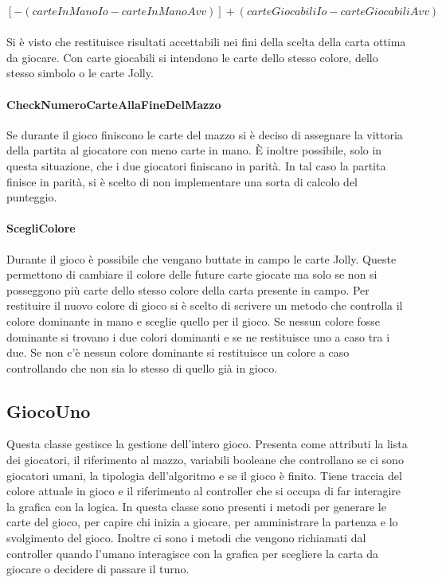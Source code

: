 $ [- (carteInManoIo - carteInManoAvv)] + (carteGiocabiliIo - carteGiocabiliAvv) $\\\\
		
		Si è visto che restituisce risultati accettabili nei fini della scelta della carta ottima da giocare. Con carte giocabili si intendono le carte dello stesso colore, dello stesso simbolo o le carte Jolly. 
		
		\paragraph{CheckNumeroCarteAllaFineDelMazzo}
		Se durante il gioco finiscono le carte del mazzo si è deciso di assegnare la vittoria della partita al giocatore con meno carte in mano. È inoltre possibile, solo in questa situazione, che i due giocatori finiscano in parità. In tal caso la partita finisce in parità, si è scelto di non implementare una sorta di calcolo del punteggio.
		
		\paragraph{ScegliColore}
		Durante il gioco è possibile che vengano buttate in campo le carte Jolly. Queste permettono di cambiare il colore delle future carte giocate ma solo se non si posseggono più carte dello stesso colore della carta presente in campo. Per restituire il nuovo colore di gioco si è scelto di scrivere un metodo che controlla il colore dominante in mano e sceglie quello per il gioco. Se nessun colore fosse dominante si trovano i due colori dominanti e se ne restituisce uno a caso tra i due. Se non c'è nessun colore dominante si restituisce un colore a caso controllando che non sia lo stesso di quello già in gioco.
	
	\subsection{GiocoUno}
		Questa classe gestisce la gestione dell'intero gioco. Presenta come attributi la lista dei giocatori, il riferimento al mazzo, variabili booleane che controllano se ci sono giocatori umani, la tipologia dell'algoritmo e se il gioco è finito. Tiene traccia del colore attuale in gioco e il riferimento al controller che si occupa di far interagire la grafica con la logica. In questa classe sono presenti i metodi per generare le carte del gioco, per capire chi inizia a giocare, per amministrare la partenza e lo svolgimento del gioco. Inoltre ci sono i metodi che vengono richiamati dal controller quando l'umano interagisce con la grafica per scegliere la carta da giocare o decidere di passare il turno.

